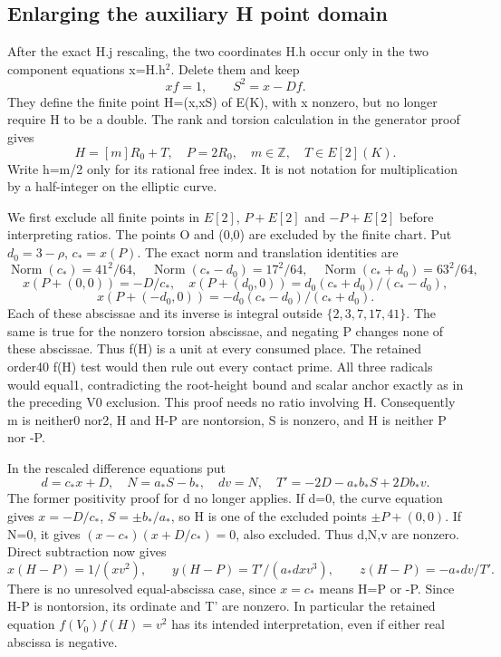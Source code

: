 \subsection{Enlarging the auxiliary H point domain}
After the exact H.j rescaling, the two coordinates H.h occur only
in the two component equations x=H.h$^2$. Delete them and keep
\[
                  xf=1,\qquad S^2=x-Df.
\]
They define the finite point H=(x,xS) of E(K), with x nonzero,
but no longer require H to be a double. The rank and torsion
calculation in the generator proof gives
\[
 H=[m]R_0+T,\quad P=2R_0,\quad m\in\mathbb Z,\quad T\in E[2](K).
\]
Write h=m/2 only for its rational free index. It is not notation
for multiplication by a half-integer on the elliptic curve.

We first exclude all finite points in $E[2]$, $P+E[2]$ and
$-P+E[2]$ before interpreting ratios. The points O and (0,0) are
excluded by the finite chart. Put $d_0=3-\rho$, $c_*=x(P)$.
The exact norm and translation identities are
\[
 \operatorname{Norm}(c_*)=41^2/64,\quad
 \operatorname{Norm}(c_*-d_0)=17^2/64,\quad
 \operatorname{Norm}(c_*+d_0)=63^2/64,
\]
\[
 x(P+(0,0))=-D/c_*,\quad
 x(P+(d_0,0))=d_0(c_*+d_0)/(c_*-d_0),
\]
\[
 x(P+(-d_0,0))=-d_0(c_*-d_0)/(c_*+d_0).
\]
Each of these abscissae and its inverse is integral outside
$\{2,3,7,17,41\}$. The same is true for the nonzero torsion
abscissae, and negating P changes none of these abscissae. Thus
f(H) is a unit at every consumed place. The retained order40 f(H)
test would then rule out every contact prime. All three radicals
would equal1, contradicting the root-height bound and scalar anchor
exactly as in the preceding V0 exclusion. This proof needs no
ratio involving H. Consequently m is neither0 nor2, H and H-P are
nontorsion, S is nonzero, and H is neither P nor -P.

In the rescaled difference equations put
\[
 d=c_*x+D,\quad N=a_*S-b_*,\quad dv=N,\quad
 T'=-2D-a_*b_*S+2Db_*v.
\]
The former positivity proof for d no longer applies. If d=0, the
curve equation gives $x=-D/c_*$, $S=\pm b_*/a_*$, so H is one of
the excluded points $\pm P+(0,0)$. If N=0, it gives
$(x-c_*)(x+D/c_*)=0$, also excluded. Thus d,N,v are nonzero.
Direct subtraction now gives
\[
 x(H-P)=1/(xv^2),\qquad y(H-P)=T'/(a_*dxv^3),
 \qquad z(H-P)=-a_*dv/T'.
\]
There is no unresolved equal-abscissa case, since $x=c_*$ means
H=P or -P. Since H-P is nontorsion, its ordinate and T' are
nonzero. In particular the retained equation $f(V_0)f(H)=v^2$ has
its intended interpretation, even if either real abscissa is negative.

